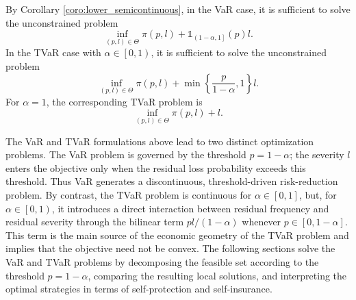\documentclass[a4paper,12pt]{article}
\begin{document}
By Corollary \ref{coro:lower_semicontinuous}, in the VaR case, it is sufficient to solve the unconstrained problem
\begin{equation}
\inf_{\left(p,l\right)\in\Theta}\pi\left(p,l\right)+\mathds{1}_{\left(1-\alpha,1\right]}\left(p\right)l.
\label{eq:VaR_problem}
\end{equation}
In the TVaR case with $\alpha\in\left[0,1\right)$, it is sufficient to solve the unconstrained problem
\begin{equation}
\inf_{\left(p,l\right)\in\Theta}\pi\left(p,l\right)+\min\left\{\frac{p}{1-\alpha},1\right\}l.
\label{eq:TVaR_problem}
\end{equation}
For $\alpha=1$, the corresponding TVaR problem is
\begin{equation}
\inf_{\left(p,l\right)\in\Theta}\pi\left(p,l\right)+l.
\label{eq:TVaR_problem_2}
\end{equation}

The VaR and TVaR formulations above lead to two distinct optimization problems. The VaR problem is governed by the threshold $p=1-\alpha$; the severity $l$ enters the objective only when the residual loss probability exceeds this threshold. Thus VaR generates a discontinuous, threshold-driven risk-reduction problem. By contrast, the TVaR problem is continuous for $\alpha\in\left[0,1\right]$, but, for $\alpha\in\left[0,1\right)$, it introduces a direct interaction between residual frequency and residual severity through the bilinear term $pl/\left(1-\alpha\right)$ whenever $p\in\left[0,1-\alpha\right]$. This term is the main source of the economic geometry of the TVaR problem and implies that the objective need not be convex. The following sections solve the VaR and TVaR problems by decomposing the feasible set according to the threshold $p=1-\alpha$, comparing the resulting local solutions, and interpreting the optimal strategies in terms of self-protection and self-insurance.
\end{document}

